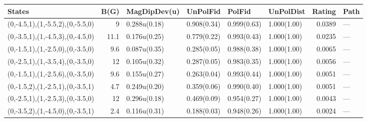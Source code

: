 \begin{tabular}{lrllllrl}
\hline
 States                           &   B(G) & MagDipDev(u)   & UnPolFid    & PolFid      & UnPolDist   &   Rating & Path   \\
\hline
 (0,-4.5,1),(1,-5.5,2),(0,-5.5,0) &    9   & 0.288u(0.18)   & 0.908(0.34) & 0.999(0.63) & 1.000(1.00) &   0.0389 & ---    \\
 (0,-3.5,1),(1,-4.5,3),(0,-4.5,0) &   11.1 & 0.176u(0.25)   & 0.779(0.22) & 0.993(0.43) & 1.000(1.00) &   0.0235 & ---    \\
 (0,-1.5,1),(1,-2.5,0),(0,-3.5,0) &    9.6 & 0.087u(0.35)   & 0.285(0.05) & 0.988(0.38) & 1.000(1.00) &   0.0065 & ---    \\
 (0,-2.5,1),(1,-3.5,4),(0,-3.5,0) &   12   & 0.105u(0.32)   & 0.287(0.05) & 0.983(0.35) & 1.000(1.00) &   0.0056 & ---    \\
 (0,-1.5,1),(1,-2.5,6),(0,-3.5,0) &    9.6 & 0.155u(0.27)   & 0.263(0.04) & 0.993(0.44) & 1.000(1.00) &   0.0051 & ---    \\
 (0,-1.5,2),(1,-2.5,1),(0,-3.5,1) &    4.7 & 0.249u(0.20)   & 0.359(0.06) & 0.990(0.40) & 1.000(1.00) &   0.0051 & ---    \\
 (0,-2.5,1),(1,-2.5,3),(0,-3.5,0) &   12   & 0.296u(0.18)   & 0.469(0.09) & 0.954(0.27) & 1.000(1.00) &   0.0043 & ---    \\
 (0,-3.5,2),(1,-4.5,0),(0,-3.5,1) &    2.4 & 0.116u(0.31)   & 0.188(0.03) & 0.948(0.26) & 1.000(1.00) &   0.0024 & ---    \\
\hline
\end{tabular}